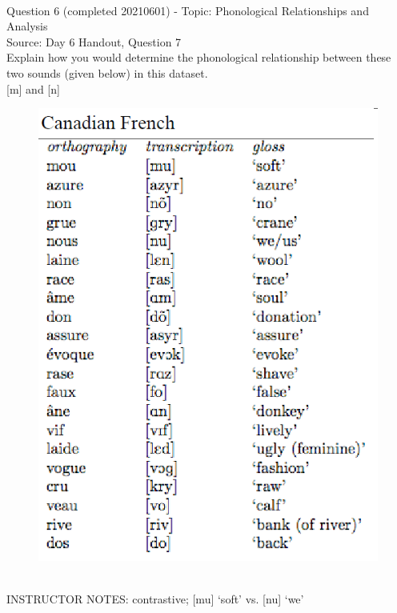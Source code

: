 \documentclass[12pt]{article}
\begin{document}
~\\

{\large Question 6} (completed 20210601) - Topic: Phonological Relationships and Analysis\\
Source: Day 6 Handout, Question 7\\

Explain how you would determine the phonological relationship between these two sounds (given below) in this dataset.\\

{[m]} and {[n]}

\begin{figure}[H]
\includegraphics{../images/canadianfrench.png}
\end{figure}

~\\
INSTRUCTOR NOTES: contrastive; [mu] ‘soft’ vs. [nu] ‘we’


~\\
\end{document}
